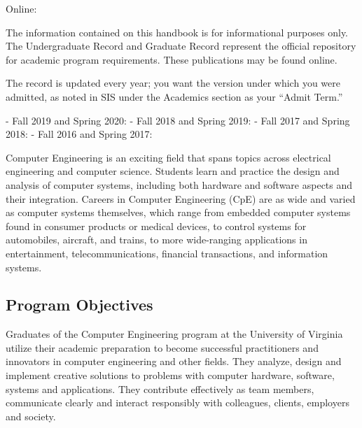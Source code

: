 \noindent Online: \bscpeURL


The information contained on this handbook is for informational
purposes only. The Undergraduate Record and Graduate Record represent
the official repository for academic program requirements. These
publications may be found online.

The record is updated every year; you want the version under which you were admitted,
as noted in SIS under the Academics section as your ``Admit Term.''

- Fall 2019 and Spring 2020: 
- Fall 2018 and Spring 2019: 
- Fall 2017 and Spring 2018: 
- Fall 2016 and Spring 2017: 




Computer Engineering is an exciting field that spans topics across
electrical engineering and computer science.  Students learn and
practice the design and analysis of computer systems, including both
hardware and software aspects and their integration. Careers in
Computer Engineering (CpE) are as wide and varied as computer systems
themselves, which range from embedded computer systems found in
consumer products or medical devices, to control systems for
automobiles, aircraft, and trains, to more wide-ranging applications
in entertainment, telecommunications, financial transactions, and
information systems.


\subsection{Program Objectives}

Graduates of the Computer Engineering program at the
University of Virginia utilize their academic preparation
to become successful practitioners and innovators in
computer engineering and other fields. They analyze,
design and implement creative solutions to problems
with computer hardware, software, systems and
applications. They contribute effectively as team
members, communicate clearly and interact responsibly
with colleagues, clients, employers and society.

